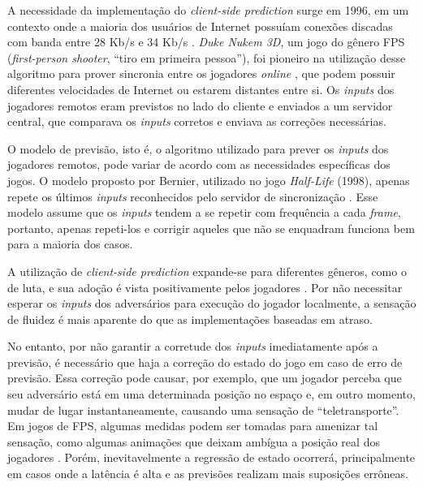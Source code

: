A necessidade da implementação do \textit{client-side prediction} surge em 1996, em um contexto onde a maioria dos usuários de Internet possuíam conexões discadas com banda entre 28 Kb/s e 34 Kb/s \cite{broadband}. \textit{Duke Nukem 3D}, um jogo do gênero FPS (\textit{first-person shooter}, ``tiro em primeira pessoa''), foi pioneiro na utilização desse algoritmo para prover sincronia entre os jogadores \textit{online} \cite{duke_nukem}, que podem possuir diferentes velocidades de Internet ou estarem distantes entre si. Os \textit{inputs} dos jogadores remotos eram previstos no lado do cliente e enviados a um servidor central, que comparava os \textit{inputs} corretos e enviava as correções necessárias.

O modelo de previsão, isto é, o algoritmo utilizado para prever os \textit{inputs} dos jogadores remotos, pode variar de acordo com as necessidades específicas dos jogos. O modelo proposto por Bernier, utilizado no jogo \textit{Half-Life} (1998), apenas repete os últimos \textit{inputs} reconhecidos pelo servidor de sincronização \cite{client-side-prediction}. Esse modelo assume que os \textit{inputs} tendem a se repetir com frequência a cada \textit{frame}, portanto, apenas repeti-los e corrigir aqueles que não se enquadram funciona bem para a maioria dos casos.

A utilização de \textit{client-side prediction} expande-se para diferentes gêneros, como o de luta, e sua adoção é vista positivamente pelos jogadores \cite{rollback_success}. Por não necessitar esperar os \textit{inputs} dos adversários para execução do jogador localmente, a sensação de fluidez é mais aparente do que as implementações baseadas em atraso.

No entanto, por não garantir a corretude dos \textit{inputs} imediatamente após a previsão, é necessário que haja a correção do estado do jogo em caso de erro de previsão. Essa correção pode causar, por exemplo, que um jogador perceba que seu adversário está em uma determinada posição no espaço e, em outro momento, mudar de lugar instantaneamente, causando uma sensação de ``teletransporte''. Em jogos de FPS, algumas medidas podem ser tomadas para amenizar tal sensação, como algumas animações que deixam ambígua a posição real dos jogadores \cite{ronnie}. Porém, inevitavelmente a regressão de estado ocorrerá, principalmente em casos onde a latência é alta e as previsões realizam mais suposições errôneas.
